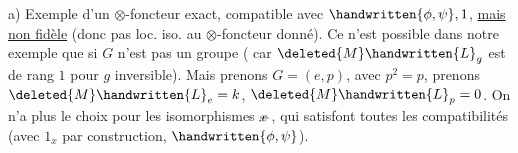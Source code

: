 a) Exemple d'un $\otimes$-foncteur exact, compatible avec $\handwritten{\phi,\psi},1$, \uline{mais non fidèle} (donc pas loc. iso. au $\otimes$-foncteur donné). Ce n'est possible dans notre exemple que si $G$ n'est pas un groupe ( car $\deleted{M}\handwritten{L}_g$ est de rang $1$ pour $g$ inversible). Mais prenons $G=(e,p)$, avec $p^2=p$, prenons $\deleted{M}\handwritten{L}_e=k$, $\deleted{M}\handwritten{L}_p=0$. On n'a plus le choix pour les isomorphismes $\rlap{\(x\)}-$, qui satisfont toutes les compatibilités (avec $1_x$ par construction, $\handwritten{\phi,\psi}$).
